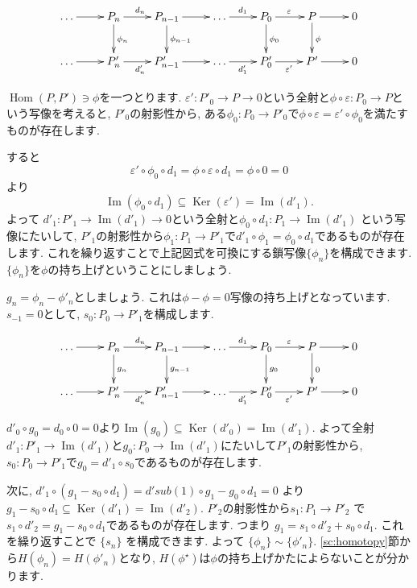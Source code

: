 \documentclass{jsarticle}
\newcommand{\makeop}[1]{\mathop{\mathrm{#1}}\nolimits}
\def\Im{\makeop{Im}}
\def\Ker{\makeop{Ker}}
\def\Hom{\makeop{Hom}}
\theoremstyle{definition}
\numberwithin{theorem}{section}
\begin{document}
\begin{equation*}
\xymatrix{
  \ldots \ar[r] & P_n \ar[r]^{d_n} \ar[d]^{\phi_n} & P_{n-1} \ar[r] \ar[d]^{\phi_{n-1}} & \ldots \ar[r]^{d_1} & P_0 \ar[r]^{\varepsilon} \ar[d]^{\phi_0} & P \ar[r] \ar[d]^{\phi} & 0 \\
  \ldots \ar[r] & P'_n \ar[r]_{d'_n} & P'_{n-1} \ar[r]& \ldots \ar[r]_{d'_1}& P'_0 \ar[r]_{\varepsilon'} & P' \ar[r]& 0
}
\end{equation*}

$\Hom(P, P') \ni \phi$を一つとります. $\varepsilon': P'_0 \rightarrow P \rightarrow 0$という全射と$\phi\circ\varepsilon: P_0 \rightarrow P$という写像を考えると,
$P'_0$の射影性から, ある$\phi_0: P_0 \rightarrow P'_0$で$\phi\circ\varepsilon = \varepsilon'\circ\phi_0$を満たすものが存在します.

すると
\[
\varepsilon'\circ\phi_0\circ d_1 = \phi\circ\varepsilon\circ d_1 = \phi\circ 0 = 0
\]
より
\[
\Im(\phi_0\circ d_1) \subseteq \Ker(\varepsilon') = \Im(d'_1).
\]
よって $d'_1 : P'_1 \rightarrow \Im(d'_1) \rightarrow 0$という全射と$\phi_0\circ d_1: P_1 \rightarrow \Im(d'_1)$
という写像にたいして, $P'_1$の射影性から$\phi_1: P_1 \rightarrow P'_1$で$d'_1\circ \phi_1 = \phi_0\circ d_1$であるものが存在します.
これを繰り返すことで上記図式を可換にする鎖写像$\{\phi_n\}$を構成できます. $\{\phi_n\}$を$\phi$の持ち上げということにしましょう.

$g_n = \phi_n - \phi'_n$としましょう. これは$\phi-\phi = 0$写像の持ち上げとなっています. $s_{-1} = 0$として,
$s_0: P_0 \rightarrow P'_1$を構成します.

\begin{equation*}
\xymatrix{
  \ldots \ar[r] & P_n \ar[r]^{d_n} \ar[d]^{g_n} & P_{n-1} \ar[r] \ar[d]^{g_{n-1}} & \ldots \ar[r]^{d_1} & P_0 \ar[r]^{\varepsilon} \ar[d]^{g_0} & P \ar[r] \ar[d]^{0} & 0 \\
  \ldots \ar[r] & P'_n \ar[r]_{d'_n} & P'_{n-1} \ar[r]& \ldots \ar[r]_{d'_1}& P'_0 \ar[r]_{\varepsilon'} & P' \ar[r]& 0
}
\end{equation*}

$d'_0\circ g_0 = d_0\circ 0 = 0$より$\Im(g_0) \subseteq \Ker(d'_0) = \Im(d'_1)$. よって全射
$d'_1: P'_1 \rightarrow \Im(d'_1)$と$g_0: P_0 \rightarrow \Im(d'_1)$にたいして$P'_1$の射影性から,
$s_0: P_0 \rightarrow P'_1$で$g_0 = d'_1 \circ s_0$であるものが存在します.

次に, $d'_1\circ(g_1 - s_0\circ d_1) = d'sub(1)\circ g_1 - g_0 \circ d_1 = 0$ より
$g_1 - s_0 \circ d_1 \subseteq \Ker(d'_1) = \Im(d'_2)$.
$P'_2$の射影性から$s_1: P_1 \rightarrow P'_2$ で $s_1\circ d'_2 = g_1 - s_0\circ d_1$であるものが存在します. つまり
$g_1 = s_1\circ d'_2 + s_0\circ d_1$. これを繰り返すことで $\{s_n\}$ を構成できます. よって $\{\phi_n\} \sim \{\phi'_n\}$.
\ref{sc:homotopy}節から$H(\phi_n) = H(\phi'_n)$となり, $H(\phi^\star)$は$\phi$の持ち上げかたによらないことが分かります.
\end{document}
